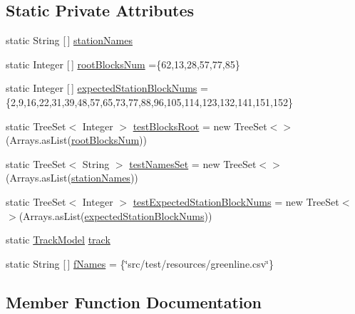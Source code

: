 \subsection*{Static Private Attributes}
\begin{DoxyCompactItemize}
\item 
static String \mbox{[}$\,$\mbox{]} \hyperlink{classTrackModelTest_1_1GreenlineTest_a47a3798d755d618e273ca1a11180db16}{station\+Names}
\item 
static Integer \mbox{[}$\,$\mbox{]} \hyperlink{classTrackModelTest_1_1GreenlineTest_a86d7af0d8ab2f0c855bdca4a06220e1d}{root\+Blocks\+Num} =\{62,13,28,57,77,85\}
\item 
static Integer \mbox{[}$\,$\mbox{]} \hyperlink{classTrackModelTest_1_1GreenlineTest_a70a5b1b7c0ad03d4ee8c021d32fc6585}{expected\+Station\+Block\+Nums} =\{2,9,16,22,31,39,48,57,65,73,77,88,96,105,114,123,132,141,151,152\}
\item 
static Tree\+Set$<$ Integer $>$ \hyperlink{classTrackModelTest_1_1GreenlineTest_aee2fde5125328429838201f535d0aca7}{test\+Blocks\+Root} = new Tree\+Set$<$$>$(Arrays.\+as\+List(\hyperlink{classTrackModelTest_1_1GreenlineTest_a86d7af0d8ab2f0c855bdca4a06220e1d}{root\+Blocks\+Num}))
\item 
static Tree\+Set$<$ String $>$ \hyperlink{classTrackModelTest_1_1GreenlineTest_a3507467040486c396edb29364f5a7bcd}{test\+Names\+Set} = new Tree\+Set$<$$>$(Arrays.\+as\+List(\hyperlink{classTrackModelTest_1_1GreenlineTest_a47a3798d755d618e273ca1a11180db16}{station\+Names}))
\item 
static Tree\+Set$<$ Integer $>$ \hyperlink{classTrackModelTest_1_1GreenlineTest_a96de7e923c81cdf0dd85ece9d95104cc}{test\+Expected\+Station\+Block\+Nums} = new Tree\+Set$<$$>$(Arrays.\+as\+List(\hyperlink{classTrackModelTest_1_1GreenlineTest_a70a5b1b7c0ad03d4ee8c021d32fc6585}{expected\+Station\+Block\+Nums}))
\item 
static \hyperlink{classTrackModel_1_1TrackModel}{Track\+Model} \hyperlink{classTrackModelTest_1_1GreenlineTest_afbfade7894862ab761d49ad840142241}{track}
\item 
static String \mbox{[}$\,$\mbox{]} \hyperlink{classTrackModelTest_1_1GreenlineTest_a02bea164e581cd44c7013e6de9453499}{f\+Names} = \{\char`\"{}src/test/resources/greenline.\+csv\char`\"{}\}
\end{DoxyCompactItemize}


\subsection{Member Function Documentation}
\mbox{\label{classTrackModelTest_1_1GreenlineTest_a3c1cb1eeb41248285ee3e24d71de725c}} 
